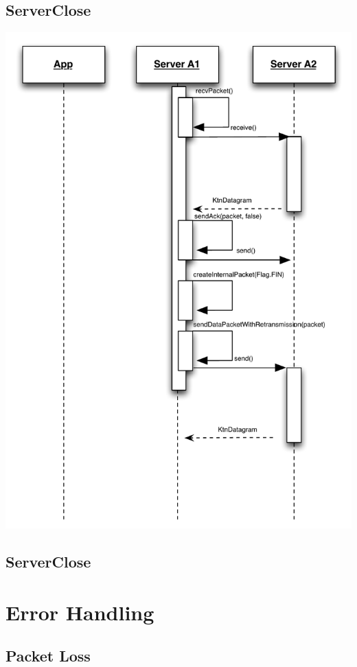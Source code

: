 \documentclass{article}
\begin{document}
\subsection{ServerClose}
\includegraphics[scale=0.8]{ktnServerClose.pdf}

\subsection{ServerClose}

\section{Error Handling}

\subsection{Packet Loss}
\end{document}
